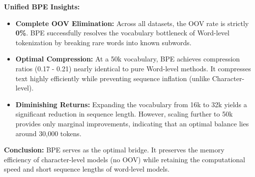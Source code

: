 \textbf{Unified BPE Insights:}
\begin{itemize}
    \item \textbf{Complete OOV Elimination:} Across all datasets, the OOV rate is strictly \textbf{0\%}. BPE successfully resolves the vocabulary bottleneck of Word-level tokenization by breaking rare words into known subwords.
    \item \textbf{Optimal Compression:} At a 50k vocabulary, BPE achieves compression ratios (0.17 - 0.21) nearly identical to pure Word-level methods. It compresses text highly efficiently while preventing sequence inflation (unlike Character-level).
    \item \textbf{Diminishing Returns:} Expanding the vocabulary from 16k to 32k yields a significant reduction in sequence length. However, scaling further to 50k provides only marginal improvements, indicating that an optimal balance lies around 30,000 tokens.
\end{itemize}

\textbf{Conclusion:} BPE serves as the optimal bridge. It preserves the memory efficiency of character-level models (no OOV) while retaining the computational speed and short sequence lengths of word-level models.